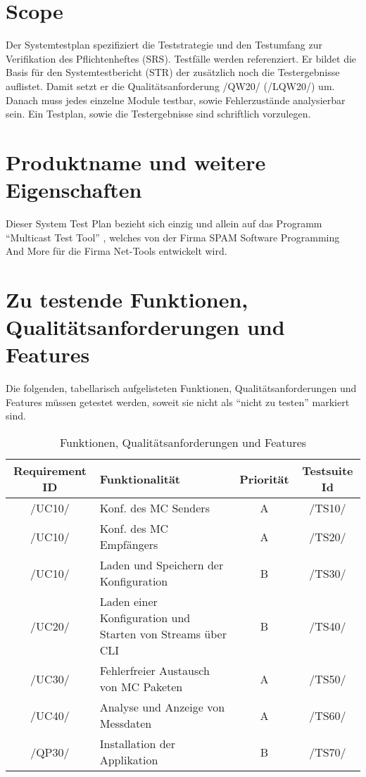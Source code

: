
\chapter{Scope}
Der Systemtestplan spezifiziert die Teststrategie und den Testumfang zur
Verifikation des Pflichtenheftes (SRS). Testfälle werden referenziert.
Er bildet die Basis für den Systemtestbericht (STR) der zusätzlich noch die
Testergebnisse auflistet.
\newline
Damit setzt er die Qualitätsanforderung /QW20/ (/LQW20/) um.
Danach muss jedes einzelne Module testbar, sowie Fehlerzustände
analysierbar sein. Ein Testplan, sowie die Testergebnisse sind schriftlich vorzulegen.



\chapter{Produktname und weitere Eigenschaften}
Dieser System Test Plan bezieht sich einzig und allein auf das Programm "`Multicast Test Tool"'
, welches von der Firma SPAM Software Programming And More für die Firma Net-Tools entwickelt wird.

\chapter{Zu testende Funktionen, Qualitätsanforderungen und Features}
Die folgenden, tabellarisch aufgelisteten Funktionen, Qualitätsanforderungen und
Features müssen getestet werden, soweit sie nicht als "`nicht zu testen"' markiert sind.

\begin{table}[h]
\caption{Funktionen, Qualitätsanforderungen und Features}
\label{tab:features}
\begin{center}
\begin{tabular}{|c|p{7cm}|c|c|}
\hline
\textbf{Requirement ID} & \textbf{Funktionalität} & \textbf{Priorität} & \textbf{Testsuite Id}\\
\hline
/UC10/ & Konf. des MC Senders & A & /TS10/\\
\hline
/UC10/ & Konf. des MC Empfängers & A & /TS20/\\
\hline
/UC10/ & Laden und Speichern der Konfiguration & B & /TS30/\\
\hline
/UC20/ & Laden einer Konfiguration und Starten von Streams über CLI & B & /TS40/\\
\hline
/UC30/ & Fehlerfreier Austausch von MC Paketen & A & /TS50/\\
\hline
/UC40/ & Analyse und Anzeige von Messdaten & A & /TS60/\\
\hline
/QP30/ & Installation der Applikation & B & /TS70/\\
\hline
\end{tabular}
\end{center}
\label{default}
\end{table}

